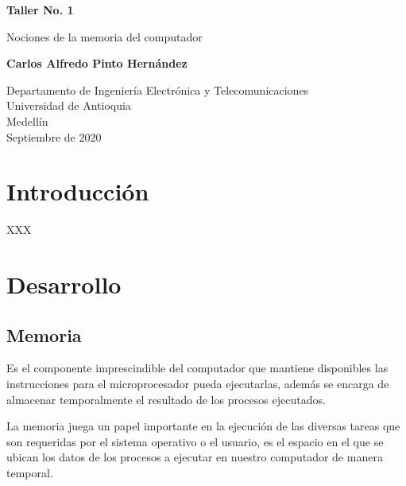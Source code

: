 \documentclass{article}
\begin{document}
\begin{titlepage}
    \begin{center}
        \vspace*{1cm}
            
        \Huge
        \textbf{Taller No. 1}
            
        \vspace{0.5cm}
        \LARGE
        Nociones de la memoria del computador
            
        \vspace{1.5cm}
            
        \textbf{Carlos Alfredo Pinto Hernández}
            
        \vfill
        
        \vspace{0.8cm}
            
        \Large
        Departamento de Ingeniería Electrónica y Telecomunicaciones\\
        Universidad de Antioquia\\
        Medellín\\
        Septiembre de 2020
            
    \end{center}
\end{titlepage}

\tableofcontents

\section{Introducción}
XXX

\section{Desarrollo} \label{contenido}
\subsection{Memoria}
Es el componente imprescindible del computador que mantiene disponibles las instrucciones para el microprocesador pueda ejecutarlas, además se encarga de almacenar temporalmente el resultado de los procesos ejecutados.\cite{EcuRed}

La memoria juega un papel importante en la ejecución de las diversas tareas que son requeridas por el sistema operativo o el usuario, es el espacio en el que se ubican los datos de los procesos a ejecutar en nuestro computador de manera temporal.
\end{document}

